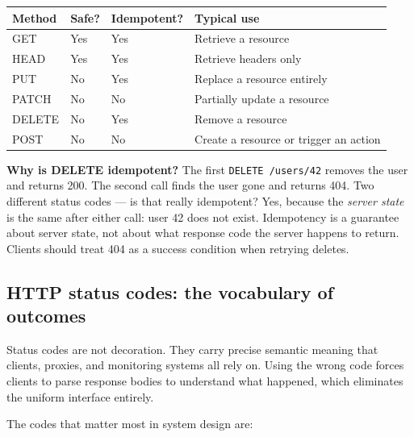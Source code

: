 \documentclass[11pt,a4paper]{article}
\begin{document}
\begin{center}
\begin{tabular}{llll}
\toprule
\textbf{Method} & \textbf{Safe?} & \textbf{Idempotent?} & \textbf{Typical use} \\
\midrule
GET    & Yes & Yes & Retrieve a resource \\
HEAD   & Yes & Yes & Retrieve headers only \\
PUT    & No  & Yes & Replace a resource entirely \\
PATCH  & No  & No  & Partially update a resource \\
DELETE & No  & Yes & Remove a resource \\
POST   & No  & No  & Create a resource or trigger an action \\
\bottomrule
\end{tabular}
\end{center}

\begin{thinkbox}
\textbf{Why is DELETE idempotent?} The first \texttt{DELETE /users/42} removes the user and returns 200. The second call finds the user gone and returns 404. Two different status codes --- is that really idempotent? Yes, because the \emph{server state} is the same after either call: user 42 does not exist. Idempotency is a guarantee about server state, not about what response code the server happens to return. Clients should treat 404 as a success condition when retrying deletes.
\end{thinkbox}

\subsection{HTTP status codes: the vocabulary of outcomes}

Status codes are not decoration. They carry precise semantic meaning that clients, proxies, and monitoring systems all rely on. Using the wrong code forces clients to parse response bodies to understand what happened, which eliminates the uniform interface entirely.

The codes that matter most in system design are:
\end{document}
